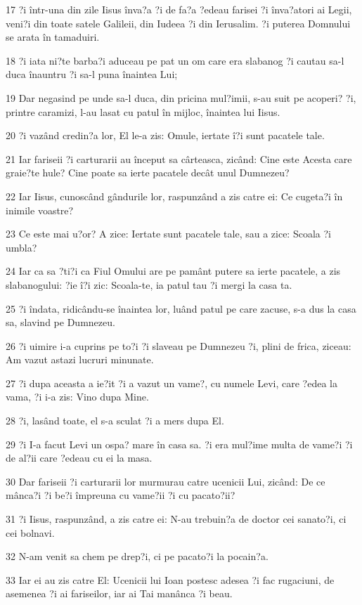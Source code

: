 \par 17 ?i într-una din zile Iisus înva?a ?i de fa?a ?edeau farisei ?i înva?atori ai Legii, veni?i din toate satele Galileii, din Iudeea ?i din Ierusalim. ?i puterea Domnului se arata în tamaduiri.
\par 18 ?i iata ni?te barba?i aduceau pe pat un om care era slabanog ?i cautau sa-l duca înauntru ?i sa-l puna înaintea Lui;
\par 19 Dar negasind pe unde sa-l duca, din pricina mul?imii, s-au suit pe acoperi? ?i, printre caramizi, l-au lasat cu patul în mijloc, înaintea lui Iisus.
\par 20 ?i vazând credin?a lor, El le-a zis: Omule, iertate î?i sunt pacatele tale.
\par 21 Iar fariseii ?i carturarii au început sa cârteasca, zicând: Cine este Acesta care graie?te hule? Cine poate sa ierte pacatele decât unul Dumnezeu?
\par 22 Iar Iisus, cunoscând gândurile lor, raspunzând a zis catre ei: Ce cugeta?i în inimile voastre?
\par 23 Ce este mai u?or? A zice: Iertate sunt pacatele tale, sau a zice: Scoala ?i umbla?
\par 24 Iar ca sa ?ti?i ca Fiul Omului are pe pamânt putere sa ierte pacatele, a zis slabanogului: ?ie î?i zic: Scoala-te, ia patul tau ?i mergi la casa ta.
\par 25 ?i îndata, ridicându-se înaintea lor, luând patul pe care zacuse, s-a dus la casa sa, slavind pe Dumnezeu.
\par 26 ?i uimire i-a cuprins pe to?i ?i slaveau pe Dumnezeu ?i, plini de frica, ziceau: Am vazut astazi lucruri minunate.
\par 27 ?i dupa aceasta a ie?it ?i a vazut un vame?, cu numele Levi, care ?edea la vama, ?i i-a zis: Vino dupa Mine.
\par 28 ?i, lasând toate, el s-a sculat ?i a mers dupa El.
\par 29 ?i I-a facut Levi un ospa? mare în casa sa. ?i era mul?ime multa de vame?i ?i de al?ii care ?edeau cu ei la masa.
\par 30 Dar fariseii ?i carturarii lor murmurau catre ucenicii Lui, zicând: De ce mânca?i ?i be?i împreuna cu vame?ii ?i cu pacato?ii?
\par 31 ?i Iisus, raspunzând, a zis catre ei: N-au trebuin?a de doctor cei sanato?i, ci cei bolnavi.
\par 32 N-am venit sa chem pe drep?i, ci pe pacato?i la pocain?a.
\par 33 Iar ei au zis catre El: Ucenicii lui Ioan postesc adesea ?i fac rugaciuni, de asemenea ?i ai fariseilor, iar ai Tai manânca ?i beau.
